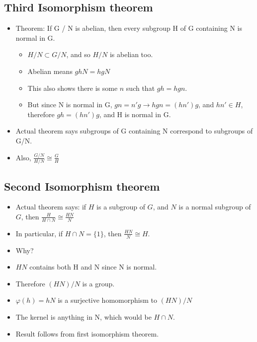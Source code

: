 \documentclass[11pt, oneside]{article}   	%
\begin{document}
\subsection{Third Isomorphism theorem}
\begin{itemize}
\item Theorem: If G / N is abelian, then every subgroup H of G containing N is normal in G.
  \begin{itemize}
\item $H / N \subset G / N$, and so $H / N$ is abelian too.
\item Abelian means $ghN = hgN$
\item This also shows there is some $n$ such that $gh = hgn$.
\item But since N is normal in G, $gn = n'g \rightarrow hgn = (hn')g$, and $hn' \in H$, therefore $gh = (hn')g$, and H is normal in G.
\end{itemize}
\item Actual theorem says subgroups of G containing N correspond to subgroups of G/N. 
\item Also, $\frac{G/N}{H/N} \cong \frac{G}{H}$
\end{itemize}

\subsection{Second Isomorphism theorem}
\begin{itemize}
\item Actual theorem says: if $H$ is a subgroup of $G$, and $N$ is a normal subgroup of $G$, then $\frac{H}{H \cap N} \cong \frac{HN}{N}$
\item In particular, if $H \cap N = \{1\}$, then $\frac{HN}{N} \cong H$.  
\item Why?  
\item $HN$ contains both H and N since N is normal.
\item Therefore $(HN)/N$ is a group.
\item $\varphi(h) = hN$ is a surjective homomorphism to $(HN)/N$
\item The kernel is anything in N, which would be $H \cap N$.
\item Result follows from first isomorphism theorem.
\end{itemize}
\end{document}
